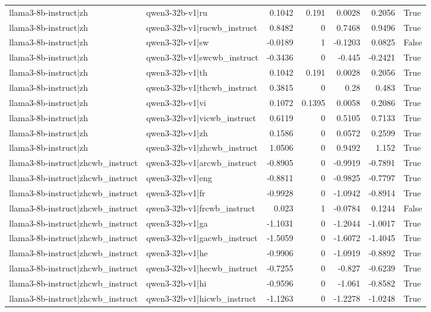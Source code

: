 \begin{table}
\begin{tabular}{l l r r r r l}
llama3-8b-instruct|zh & qwen3-32b-v1|ru & 0.1042 & 0.191 & 0.0028 & 0.2056 & True \\
llama3-8b-instruct|zh & qwen3-32b-v1|rucwb_instruct & 0.8482 & 0 & 0.7468 & 0.9496 & True \\
llama3-8b-instruct|zh & qwen3-32b-v1|sw & -0.0189 & 1 & -0.1203 & 0.0825 & False \\
llama3-8b-instruct|zh & qwen3-32b-v1|swcwb_instruct & -0.3436 & 0 & -0.445 & -0.2421 & True \\
llama3-8b-instruct|zh & qwen3-32b-v1|th & 0.1042 & 0.191 & 0.0028 & 0.2056 & True \\
llama3-8b-instruct|zh & qwen3-32b-v1|thcwb_instruct & 0.3815 & 0 & 0.28 & 0.483 & True \\
llama3-8b-instruct|zh & qwen3-32b-v1|vi & 0.1072 & 0.1395 & 0.0058 & 0.2086 & True \\
llama3-8b-instruct|zh & qwen3-32b-v1|vicwb_instruct & 0.6119 & 0 & 0.5105 & 0.7133 & True \\
llama3-8b-instruct|zh & qwen3-32b-v1|zh & 0.1586 & 0 & 0.0572 & 0.2599 & True \\
llama3-8b-instruct|zh & qwen3-32b-v1|zhcwb_instruct & 1.0506 & 0 & 0.9492 & 1.152 & True \\
llama3-8b-instruct|zhcwb_instruct & qwen3-32b-v1|arcwb_instruct & -0.8905 & 0 & -0.9919 & -0.7891 & True \\
llama3-8b-instruct|zhcwb_instruct & qwen3-32b-v1|eng & -0.8811 & 0 & -0.9825 & -0.7797 & True \\
llama3-8b-instruct|zhcwb_instruct & qwen3-32b-v1|fr & -0.9928 & 0 & -1.0942 & -0.8914 & True \\
llama3-8b-instruct|zhcwb_instruct & qwen3-32b-v1|frcwb_instruct & 0.023 & 1 & -0.0784 & 0.1244 & False \\
llama3-8b-instruct|zhcwb_instruct & qwen3-32b-v1|ga & -1.1031 & 0 & -1.2044 & -1.0017 & True \\
llama3-8b-instruct|zhcwb_instruct & qwen3-32b-v1|gacwb_instruct & -1.5059 & 0 & -1.6072 & -1.4045 & True \\
llama3-8b-instruct|zhcwb_instruct & qwen3-32b-v1|he & -0.9906 & 0 & -1.0919 & -0.8892 & True \\
llama3-8b-instruct|zhcwb_instruct & qwen3-32b-v1|hecwb_instruct & -0.7255 & 0 & -0.827 & -0.6239 & True \\
llama3-8b-instruct|zhcwb_instruct & qwen3-32b-v1|hi & -0.9596 & 0 & -1.061 & -0.8582 & True \\
llama3-8b-instruct|zhcwb_instruct & qwen3-32b-v1|hicwb_instruct & -1.1263 & 0 & -1.2278 & -1.0248 & True \\

\end{tabular}
\end{table}
